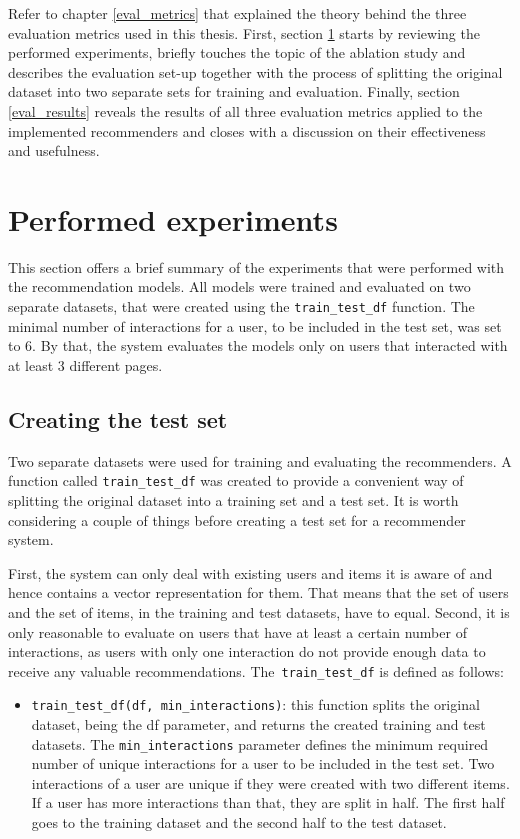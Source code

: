Refer to chapter \ref{eval_metrics} that explained the theory behind the three evaluation metrics used in this thesis. First, section \ref{eval_experiments} starts by reviewing the performed experiments, briefly touches the topic of the ablation study and describes the evaluation set-up together with the process of splitting the original dataset into two separate sets for training and evaluation. Finally, section \ref{eval_results} reveals the results of all three evaluation metrics applied to the implemented recommenders and closes with a discussion on their effectiveness and usefulness.



\section{Performed experiments} \label{eval_experiments}
This section offers a brief summary of the experiments that were performed with the recommendation models. All models were trained and evaluated on two separate datasets, that were created using the \texttt{train\_test\_df} function. The minimal number of interactions for a user, to be included in the test set, was set to 6. By that, the system evaluates the models only on users that interacted with at least 3 different pages. 

\subsection*{Creating the test set}
Two separate datasets were used for training and evaluating the recommenders. A function called \texttt{train\_test\_df} was created to provide a convenient way of splitting the original dataset into a training set and a test set. It is worth considering a couple of things before creating a test set for a recommender system. 

First, the system can only deal with existing users and items it is aware of and hence contains a vector representation for them. That means that the set of users and the set of items, in the training and test datasets, have to equal. Second, it is only reasonable to evaluate on users that have at least a certain number of interactions, as users with only one interaction do not provide enough data to receive any valuable recommendations. The~\texttt{train\_test\_df} is defined as follows:

\begin{itemize}
    \item \texttt{train\_test\_df(df, min\_interactions)}: this function splits the original dataset, being the df parameter, and returns the created training and test datasets. The \texttt{min\_interactions} parameter defines the minimum required number of unique interactions for a user to be included in the test set. Two interactions of a user are unique if they were created with two different items. If a user has more interactions than that, they are split in half. The first half goes to the training dataset and the second half to the test dataset.
\end{itemize}

